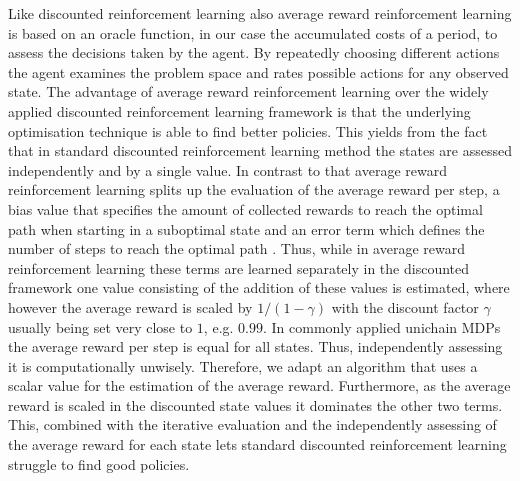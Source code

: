 \documentclass[envcountsame]{llncs}
\begin{document}
Like discounted reinforcement learning also average reward reinforcement learning is based on an
oracle function, in our case the accumulated costs of a period, to assess the decisions taken by the
agent. By repeatedly choosing different actions the agent examines the problem space and rates
possible actions for any observed state. The advantage of average reward reinforcement learning over
the widely applied discounted reinforcement learning framework is that the underlying optimisation
technique is able to find better policies. This yields from the fact that in standard discounted
reinforcement learning method the states are assessed independently and by a single value. In
contrast to that average reward reinforcement learning splits up the evaluation of the average
reward per step, a bias value that specifies the amount of collected rewards to reach the optimal
path when starting in a suboptimal state and an error term which defines the number of steps to
reach the optimal path
\citep{Howard64,Puterman94,Mahadevan96_AverageRewardReinforcementLearningFoundationsAlgorithmsAndEmpiricalResults}.
Thus, while in average reward reinforcement learning these terms are learned separately in the
discounted framework one value consisting of the addition of these values is estimated, where
however the average reward is scaled by \(1/(1-\gamma)\) with the discount factor \(\gamma\) usually
being set very close to \(1\), e.g. \(0.99\). In commonly applied unichain MDPs the average reward
per step is equal for all states. Thus, independently assessing it is computationally unwisely.
Therefore, we adapt an algorithm that uses a scalar value for the estimation of the average reward.
Furthermore, as the average reward is scaled in the discounted state values it dominates the other
two terms. This, combined with the iterative evaluation and the independently assessing of the
average reward for each state lets standard discounted reinforcement learning struggle to find good
policies.
\end{document}

